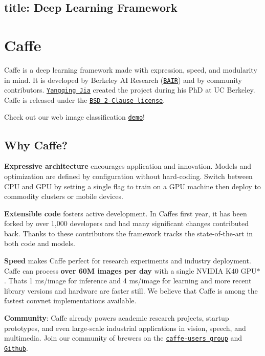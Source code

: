 

 \subsection*{title\+: Deep Learning Framework }

\section*{Caffe}

Caffe is a deep learning framework made with expression, speed, and modularity in mind. It is developed by Berkeley AI Research (\href{http://bair.berkeley.edu}{\tt B\+A\+IR}) and by community contributors. \href{http://daggerfs.com}{\tt Yangqing Jia} created the project during his PhD at UC Berkeley. Caffe is released under the \href{https://github.com/BVLC/caffe/blob/master/LICENSE}{\tt B\+SD 2-\/\+Clause license}.

Check out our web image classification \href{http://demo.caffe.berkeleyvision.org}{\tt demo}!

\subsection*{Why Caffe?}

{\bfseries Expressive architecture} encourages application and innovation. Models and optimization are defined by configuration without hard-\/coding. Switch between C\+PU and G\+PU by setting a single flag to train on a G\+PU machine then deploy to commodity clusters or mobile devices.

{\bfseries Extensible code} fosters active development. In Caffe\textquotesingle{}s first year, it has been forked by over 1,000 developers and had many significant changes contributed back. Thanks to these contributors the framework tracks the state-\/of-\/the-\/art in both code and models.

{\bfseries Speed} makes Caffe perfect for research experiments and industry deployment. Caffe can process {\bfseries over 60M images per day} with a single N\+V\+I\+D\+IA K40 G\+P\+U$\ast$. That\textquotesingle{}s 1 ms/image for inference and 4 ms/image for learning and more recent library versions and hardware are faster still. We believe that Caffe is among the fastest convnet implementations available.

{\bfseries Community}\+: Caffe already powers academic research projects, startup prototypes, and even large-\/scale industrial applications in vision, speech, and multimedia. Join our community of brewers on the \href{https://groups.google.com/forum/#!forum/caffe-users}{\tt caffe-\/users group} and \href{https://github.com/BVLC/caffe/}{\tt Github}.


